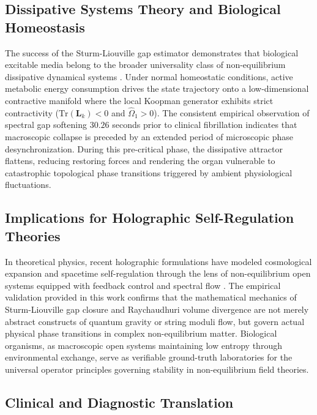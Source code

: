 \documentclass[11pt,a4paper]{article}
\begin{document}
\subsection{Dissipative Systems Theory and Biological Homeostasis}

The success of the Sturm-Liouville gap estimator demonstrates that biological excitable media belong to the broader universality class of non-equilibrium dissipative dynamical systems \cite{Willems1972, Prigogine1977}. Under normal homeostatic conditions, active metabolic energy consumption drives the state trajectory onto a low-dimensional contractive manifold where the local Koopman generator exhibits strict contractivity ($\mathrm{Tr}(\bm{L}_k) < 0$ and $\hat{\Omega}_1 > 0$). The consistent empirical observation of spectral gap softening $30.26$ seconds prior to clinical fibrillation indicates that macroscopic collapse is preceded by an extended period of microscopic phase desynchronization. During this pre-critical phase, the dissipative attractor flattens, reducing restoring forces and rendering the organ vulnerable to catastrophic topological phase transitions triggered by ambient physiological fluctuations.

\subsection{Implications for Holographic Self-Regulation Theories}

In theoretical physics, recent holographic formulations have modeled cosmological expansion and spacetime self-regulation through the lens of non-equilibrium open systems equipped with feedback control and spectral flow \cite{Yoshikai2026f}. The empirical validation provided in this work confirms that the mathematical mechanics of Sturm-Liouville gap closure and Raychaudhuri volume divergence are not merely abstract constructs of quantum gravity or string moduli flow, but govern actual physical phase transitions in complex non-equilibrium matter. Biological organisms, as macroscopic open systems maintaining low entropy through environmental exchange, serve as verifiable ground-truth laboratories for the universal operator principles governing stability in non-equilibrium field theories.

\subsection{Clinical and Diagnostic Translation}
\end{document}
